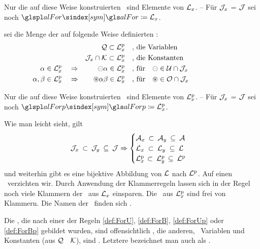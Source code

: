 Nur die auf diese Weise konstruierten \Formeln\ sind Elemente von $\mathcal{L}_x$.
-- Für $\mathcal{J}_x$ = $\mathcal{J}$ sei noch $\glsSym{alFor} \defeq \alFor_x$.

 sei die Menge der auf folgende Weise definierten %
:
\begin{align}
	&                               & \mathcal{Q}               \subset \mathcal{L}^\mathrm{p}_x
	&&& \text{, die Variablen}  \label{def:ForQp}  \\
	&                               & \mathcal{J}_x \cap \mathcal{K} \subset \mathcal{L}^\mathrm{p}_x
	&&& \text{, die Konstanten} \label{def:ForJKp} \\
	\alpha      \in\mathcal{L}^\mathrm{p}_x & \quad\Rightarrow & \mathbin\circleddash\alpha    \in\mathcal{L}^\mathrm{p}_x
	&&& \text{, für}  \quad \mathbin\circleddash \in \mathcal{U} \cap \mathcal{J}_x
	\label{def:ForUp} \\
	\alpha,\beta\in\mathcal{L}^\mathrm{p}_x & \quad\Rightarrow & \mathbin\circledast\alpha\beta\in\mathcal{L}^\mathrm{p}_x
	&&& \text{, für}  \quad \mathbin\circledast  \in \mathcal{O} \cap \mathcal{J}_x
	\label{def:ForBp} &&&&&&&&&&
\end{align}

Nur die auf diese Weise konstruierten \Formeln\ sind Elemente von $\mathcal{L}^\mathrm{p}_x$.
-- Für $\mathcal{J}_x$ = $\mathcal{J}$ sei noch $\glsSym{alForp} \defeq \alForp_x$.

Wie man leicht sieht, gilt
\begin{equation}
	\mathcal{J}_x      \: \subset \: \mathcal{J}_y  \: \subseteq \: \mathcal{J} \Rightarrow
	\begin{cases}
		\mathcal{A}_x  \: \subset \: \mathcal{A}_y  \: \subseteq \: \mathcal{A} \\
		\mathcal{L}_x  \; \subset \: \mathcal{L}_y  \; \subseteq \: \mathcal{L} \\
		\mathcal{L}^\mathrm{p}_x \, \subset \: \mathcal{L}^\mathrm{p}_y \, \subseteq \: \mathcal{L}^\mathrm{p}
	\end{cases}
\end{equation}
und weiterhin gibt es eine bijektive Abbildung von $\mathcal{L}$ nach $\mathcal{L}^\mathrm{p}$. Auf einen \Beweis\ verzichten wir.
%
Durch Anwendung der Klammerregeln  lassen sich in der Regel noch viele Klammern der \Formeln\ aus $\mathcal{L}_x$ einsparen.
Die \Formeln\ aus $\mathcal{L}^\mathrm{p}_x$ sind frei von Klammern.
Die Namen der \Junktoren\ finden sich .

Die \Formeln, die nach einer der Regeln \eqref{def:ForU}, \eqref{def:ForB}, \eqref{def:ForUp} oder \eqref{def:ForBp} gebildet wurden, sind offensichtlich , die anderen, \textdh\ Variablen und Konstanten (aus $\mathcal{Q}$ \textbzw\ $\mathcal{K}$), sind . Letztere bezeichnet man auch als .

